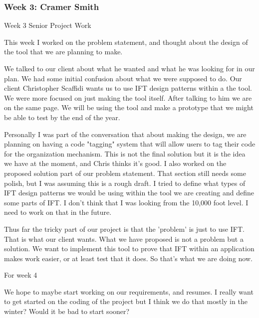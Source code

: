 \subsubsection{Week 3: Cramer Smith}

Week 3 Senior Project Work



This week I worked on the problem statement, and thought about the design of the tool that we are planning to make.



We talked to our client about what he wanted and what he was looking for in our plan. We had some initial confusion about what we were supposed to do. Our client Christopher Scaffidi wants us to use IFT design patterns within a the tool. We were more focused on just making the tool itself. After talking to him we are on the same page. We will be using the tool and make a prototype that we might be able to test by the end of the year. 



Personally I was part of the conversation that about making the design, we are planning on having a code "tagging" system that will allow users to tag their code for the organization mechanism. This is not the final solution but it is the idea we have at the moment, and Chris thinks it's good. I also worked on the proposed solution part of our problem statement. That section still needs some polish, but I was assuming this is a rough draft. I tried to define what types of IFT design patterns we would be using within the tool we are creating and define some parts of IFT. I don't think that I was looking from the 10,000 foot level. I need to work on that in the future.



Thus far the tricky part of our project is that the 'problem' is just to use IFT. That is what our client wants. What we have proposed is not a problem but a solution. We want to implement this tool to prove that IFT within an application makes work easier, or at least test that it does. So that's what we are doing now. 



For week 4



We hope to maybe start working on our requirements, and resumes. I really want to get started on the coding of the project but I think we do that mostly in the winter? Would it be bad to start sooner?  \\ 

